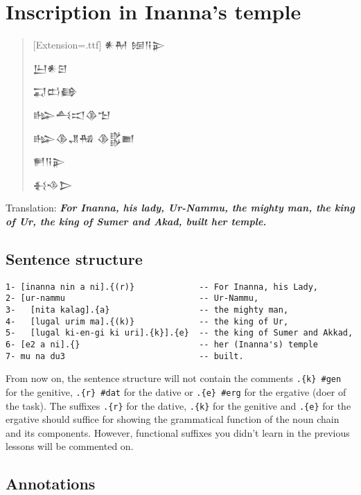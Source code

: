\documentclass[a4paper,12pt]{book}
\newcommand{\fcn}{\setmainfont{Akkadian}[Extension=.ttf]}
\begin{document}
\chapter{Inscription in Inanna's temple}

\begin{quotation}\LARGE\fcn
  𒀭𒈹 𒎏𒀀𒉌
  
  𒌨𒀭𒇉
  
  𒍑𒆗𒂵
  
  𒈗𒋀𒀊𒆠𒈠
  
  𒈗𒆠𒂗𒄀 𒆠𒌵𒆤
  
  𒂍𒀀𒉌
  
𒈬𒈾𒆕
\end{quotation}

Translation:
{\bf\em For Inanna, his lady, Ur-Nammu,
  the mighty man, the king of Ur,
  the king of Sumer and Akad, built her temple.}

\section{Sentence structure}
\begin{verbatim}
1- [inanna nin a ni].{(r)}             -- For Inanna, his Lady,
2- [ur-nammu                           -- Ur-Nammu,
3-   [nita kalag].{a}                  -- the mighty man,
4-   [lugal urim ma].{(k)}             -- the king of Ur,
5-   [lugal ki-en-gi ki uri].{k}].{e}  -- the king of Sumer and Akkad,
6- [e2 a ni].{}                        -- her (Inanna's) temple
7- mu na du3                           -- built.
\end{verbatim}

\newpage
From now on, the sentence structure
will not contain the comments \verb|.{k} #gen|
for the genitive, \verb|.{r} #dat| for the dative
or \verb|.{e} #erg| for the ergative (doer of the task).
The suffixes \verb|.{r}| for the dative,
\verb|.{k}| for the genitive
and \verb|.{e}| for the ergative
should suffice for showing the grammatical
function of the noun chain and its components.
However, functional suffixes you didn't learn
in the previous lessons will be commented on.

\section{Annotations}
\end{document}
